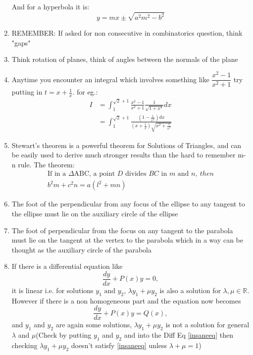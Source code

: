 \documentclass{article}
\numberwithin{equation}{section}
\numberwithin{figure}{section}
\begin{document}
\begin{enumerate}
			And for a hyperbola it is:
			\begin{equation}
				y=mx \pm \sqrt{a^2 m^2 - b^2}
			\end{equation}
		\item REMEMBER: If asked for non consecutive in combinatorics question, think "gaps"
		\item Think rotation of planes, think of angles between the normals of the plane
		\item Anytime you encounter an integral which involves something like $\dfrac{x^2-1}{x^2+1}$ try putting in $t=x+\frac{1}{x}$. for eg.:
			\begin{align*}
				I &=\int_{1}^{\sqrt{2}+1}\frac{x^2-1}{x^2+1}\frac{1}{\sqrt{1+x^4}}dx
			\\        &=\int_{1}^{\sqrt{2}+1}\frac{(1-\frac{1}{x^2})dx}{(x+\frac{1}{x})\sqrt{x^2+\frac{1}{x^2}}}
			\end{align*}
		\item Stewart's theorem is a powerful theorem for Solutions of Triangles, and can be easily used to derive much stronger results than the hard to remember m-n rule. The theorem:
			\begin{align}
				\text{If in a } \Delta \text{ABC, a point } D \text{ divides } BC \text{ in } m \text{ and } n,\ then\\
				\boxed{b^2 m +c^2 n=a(l^2+mn)}
			\end{align}
		\item The foot of the perpendicular from any focus of the ellipse to any tangent to the ellipse must lie on the auxiliary circle of the ellipse 
		\item The foot of perpendicular from the focus on any tangent to the parabola must lie on the tangent at the vertex to the parabola which in a way can be thought as the auxiliary circle of the parabola

		\item If there is a differential equation like \begin{equation}\label{saneeq}\frac{dy}{dx}+P(x)y=0,\end{equation} it is linear i.e. for solutions $y_1 \text{ and } y_2$, $\lambda y_1+\mu y_2$ is also a solution for $\lambda ,\mu \in \mathbb{R} $. However if there is a non homogeneous part and the equation now becomes \begin{equation}\label{insaneeq}\frac{dy}{dx}+P(x)y=Q(x),\end{equation}and $y_1$ and $y_2$ are again some solutions, $\lambda y_1+\mu y_2$ is not a solution for general $\lambda$ and $\mu$(Check by putting $y_1$ and $y_2$ and into the Diff Eq \ref{insaneeq}  then  checking $\lambda y_1 +\mu y_2$ doesn't satisfy \ref{insaneeq} unless $\lambda+\mu=1$)


\end{enumerate}
\end{document}
